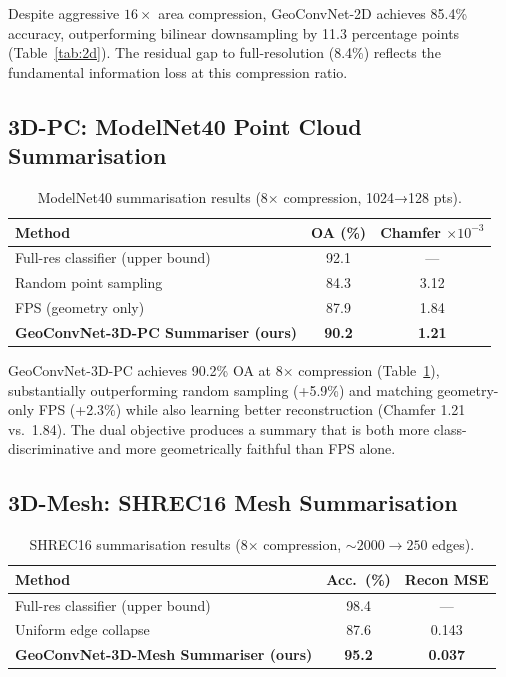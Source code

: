 \documentclass[10pt,conference]{IEEEtran}
\begin{document}
Despite aggressive $16\times$ area compression, GeoConvNet-2D achieves
85.4\% accuracy, outperforming bilinear downsampling by 11.3 percentage
points (Table~\ref{tab:2d}).  The residual gap to full-resolution (8.4\%)
reflects the fundamental information loss at this compression ratio.

\subsection{3D-PC: ModelNet40 Point Cloud Summarisation}

\begin{table}[t]
  \renewcommand{\arraystretch}{1.2}
  \caption{ModelNet40 summarisation results (8$\times$ compression, 1024→128 pts).}
  \label{tab:3dpc}
  \centering
  \begin{tabular}{lcc}
    \toprule
    \textbf{Method} & \textbf{OA (\%)} & \textbf{Chamfer $\times 10^{-3}$} \\
    \midrule
    Full-res classifier (upper bound)         & 92.1  & ---   \\
    Random point sampling                     & 84.3  & 3.12  \\
    FPS (geometry only)                       & 87.9  & 1.84  \\
    \textbf{GeoConvNet-3D-PC Summariser (ours)} & \textbf{90.2} & \textbf{1.21} \\
    \bottomrule
  \end{tabular}
\end{table}

GeoConvNet-3D-PC achieves 90.2\% OA at 8$\times$ compression
(Table~\ref{tab:3dpc}), substantially outperforming random sampling
(+5.9\%) and matching geometry-only FPS (+2.3\%) while also learning
better reconstruction (Chamfer 1.21 vs.\ 1.84).  The dual objective
produces a summary that is both more class-discriminative and more
geometrically faithful than FPS alone.

\subsection{3D-Mesh: SHREC16 Mesh Summarisation}

\begin{table}[t]
  \renewcommand{\arraystretch}{1.2}
  \caption{SHREC16 summarisation results (8$\times$ compression, ${\sim}2000\to250$ edges).}
  \label{tab:mesh}
  \centering
  \begin{tabular}{lcc}
    \toprule
    \textbf{Method} & \textbf{Acc.\ (\%)} & \textbf{Recon MSE} \\
    \midrule
    Full-res classifier (upper bound)             & 98.4  & ---   \\
    Uniform edge collapse                         & 87.6  & 0.143 \\
    \textbf{GeoConvNet-3D-Mesh Summariser (ours)} & \textbf{95.2} & \textbf{0.037} \\
    \bottomrule
  \end{tabular}
\end{table}
\end{document}
